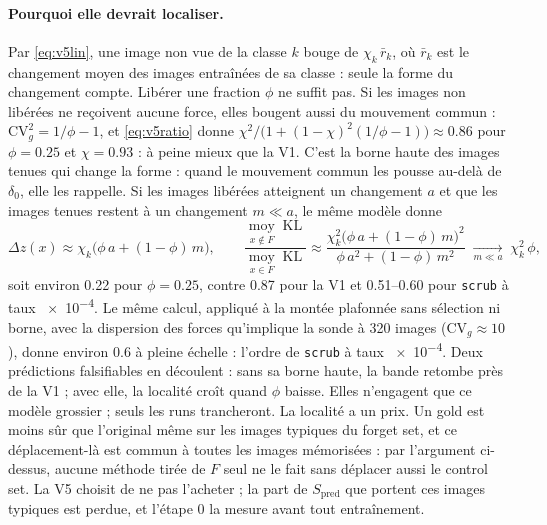 \documentclass[11pt,a4paper]{article}
\newcommand{\KL}{\operatorname{KL}}
\newcommand{\Exp}{\operatorname*{moy}}
\newcommand{\code}[1]{\texttt{#1}}
\begin{document}
\paragraph{Pourquoi elle devrait localiser.} Par \eqref{eq:v5lin}, une image non vue de la classe $k$
bouge de $\chi_k\,\bar r_k$, où $\bar r_k$ est le changement moyen des images entraînées de sa classe :
seule la forme du changement compte. Libérer une fraction $\phi$ ne suffit pas. Si les images non
libérées ne reçoivent aucune force, elles bougent aussi du mouvement commun : $\mathrm{CV}_g^2=1/\phi-1$,
et \eqref{eq:v5ratio} donne $\chi^2/\bigl(1+(1-\chi)^2(1/\phi-1)\bigr)\approx\num{0.86}$ pour
$\phi=\num{0.25}$ et $\chi=\num{0.93}$ : à peine mieux que la V1. C'est la borne haute des images tenues
qui change la forme : quand le mouvement commun les pousse au-delà de $\delta_0$, elle les rappelle. Si
les images libérées atteignent un changement $a$ et que les images tenues restent à un changement
$m\ll a$, le même modèle donne
\begin{equation}\label{eq:v5hold}
  \Delta z(x)\approx\chi_k\bigl(\phi\,a+(1-\phi)\,m\bigr),\qquad
  \frac{\Exp_{x\notin F}\KL}{\Exp_{x\in F}\KL}\approx\frac{\chi_k^2\bigl(\phi\,a+(1-\phi)\,m\bigr)^2}{\phi\,a^2+(1-\phi)\,m^2}
  \;\xrightarrow[m\ll a]{}\;\chi_k^2\,\phi ,
\end{equation}
soit environ \num{0.22} pour $\phi=\num{0.25}$, contre \num{0.87} pour la V1 et \numrange{0.51}{0.60}
pour \code{scrub} à taux \num{e-4}. Le même calcul, appliqué à la montée plafonnée sans sélection ni
borne, avec la dispersion des forces qu'implique la sonde à 320 images ($\mathrm{CV}_g\approx10$),
donne environ \num{0.6} à pleine échelle : l'ordre de \code{scrub} à taux \num{e-4}. Deux prédictions
falsifiables en découlent : sans sa borne haute, la bande retombe près de la V1 ; avec elle, la
localité croît quand $\phi$ baisse. Elles n'engagent que ce modèle grossier ; seuls les runs
trancheront. La localité a un prix. Un gold est moins sûr que l'original même sur les images typiques
du forget set, et ce déplacement-là est commun à toutes les images mémorisées : par l'argument
ci-dessus, aucune méthode tirée de $F$ seul ne le fait sans déplacer aussi le control set. La V5
choisit de ne pas l'acheter ; la part de $S_{\text{pred}}$ que portent ces images typiques est perdue,
et l'étape 0 la mesure avant tout entraînement.
\end{document}
